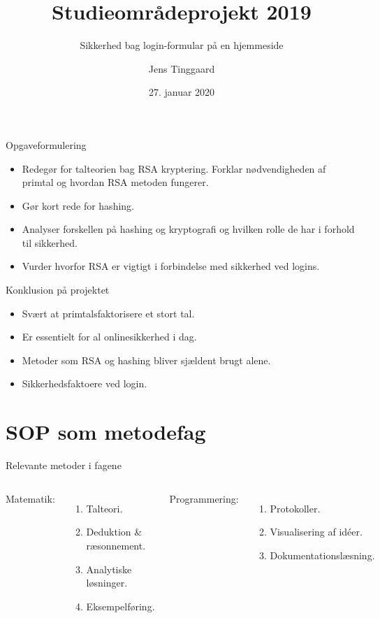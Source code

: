 \documentclass[10pt, aspectratio=169, usepdftitle=false]{beamer}
\title{Studieområdeprojekt 2019}
\subtitle{Sikkerhed bag login-formular på en hjemmeside}
\date{27. januar 2020}
\author{Jens Tinggaard}
\institute{Odense Tekniske Gymnasium}
\begin{document}
\maketitle


\begin{frame}{Opgaveformulering}
    \large
    \begin{itemize}
        \item Redegør for talteorien bag RSA kryptering. Forklar nødvendigheden af primtal og hvordan RSA metoden fungerer.
        \item Gør kort rede for hashing.
        \item Analyser forskellen på hashing og kryptografi og hvilken rolle de har i forhold til sikkerhed.
        \item Vurder hvorfor RSA er vigtigt i forbindelse med sikkerhed ved logins.
    \end{itemize}
\end{frame}

\begin{frame}{Konklusion på projektet}
    \large
    \begin{itemize}
        \item Svært at primtalsfaktorisere et stort tal.
        \item Er essentielt for al onlinesikkerhed i dag.
        \item Metoder som RSA og hashing bliver sjældent brugt alene.
        \item Sikkerhedsfaktoere ved login.
    \end{itemize}
\end{frame}

\section{SOP som metodefag}

\begin{frame}{Relevante metoder i fagene}
    \large
    \begin{columns}[T,onlytextwidth]
            \alert{Matematik:}
            \begin{enumerate}
                \item Talteori.
                \item Deduktion \& ræsonnement.
                \item Analytiske løsninger.
                \item Eksempelføring.
            \end{enumerate}
            \alert{Programmering:}
            \begin{enumerate}
                \item Protokoller.
                \item Visualisering af id\'eer.
                \item Dokumentationslæsning.
            \end{enumerate}
    \end{columns}
\end{frame}
\end{document}
